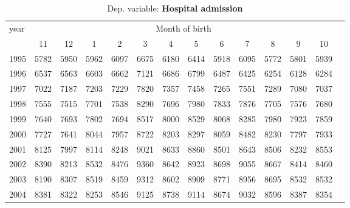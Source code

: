  \begin{table}[H] \begin{threeparttable} \centering \caption{Dep. variable: \textbf{Hospital admission}} {\def\sym#1{\ifmmode^{#1}\else\(^{#1}\)\fi} \begin{tabular}{l*{13}{c}} \toprule year & \multicolumn{12}{c}{Month of birth} \\ \cmidrule(lr){2-13} 
            &          11&          12&           1&           2&           3&           4&           5&           6&           7&           8&           9&          10\\
1995        &        5782&        5950&        5962&        6097&        6675&        6180&        6414&        5918&        6095&        5772&        5801&        5939\\
1996        &        6537&        6563&        6603&        6662&        7121&        6686&        6799&        6487&        6425&        6254&        6128&        6284\\
1997        &        7022&        7187&        7203&        7229&        7820&        7357&        7458&        7265&        7551&        7289&        7080&        7037\\
1998        &        7555&        7515&        7701&        7538&        8290&        7696&        7980&        7833&        7876&        7705&        7576&        7680\\
1999        &        7640&        7693&        7802&        7694&        8517&        8000&        8529&        8068&        8285&        7980&        7923&        7859\\
2000        &        7727&        7641&        8044&        7957&        8722&        8203&        8297&        8059&        8482&        8230&        7797&        7933\\
2001        &        8125&        7997&        8114&        8248&        9021&        8633&        8860&        8501&        8643&        8506&        8232&        8553\\
2002        &        8390&        8213&        8532&        8476&        9360&        8642&        8923&        8698&        9055&        8667&        8414&        8460\\
2003        &        8190&        8307&        8519&        8459&        9312&        8602&        8909&        8771&        8956&        8695&        8532&        8532\\
2004        &        8381&        8322&        8253&        8546&        9125&        8738&        9114&        8674&        9032&        8596&        8387&        8354\\

\end{tabular}}
\end{threeparttable}
\end{table}
